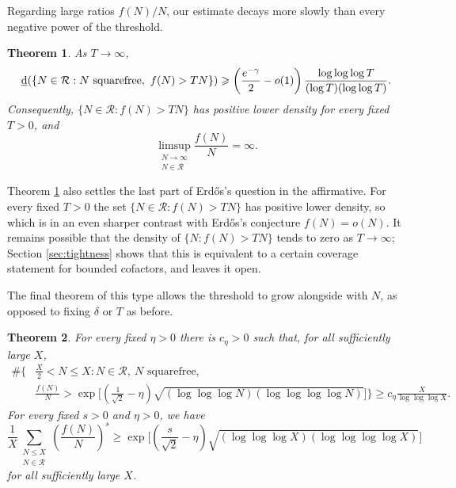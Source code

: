 \documentclass[11pt,letterpaper,reqno]{amsart}
\numberwithin{equation}{section}
\newtheorem{theorem}{Theorem}[section]
\theoremstyle{remark}
\newcommand{\N}{\mathbb{N}}
\newcommand{\Rcal}{\mathcal{R}}
\newcommand{\1}{\mathbf 1}
\newcommand{\lowerdens}{\underline{\textup{d}}}
\renewcommand{\leq}{\leqslant}
\renewcommand{\geq}{\geqslant}
\begin{document}
Regarding large ratios $f(N)/N$, our estimate decays more slowly than every
negative power of the threshold.

\begin{theorem}
\label{thm:almost-log-tail}
As $T\to\infty$,
\begin{equation}\label{eq:almost-log-tail}
 \lowerdens(\{N\in\Rcal:N\text{ squarefree},\ f(N)>TN\})
 \geq\left(\frac{e^{-\gamma}}2-o(1)\right)
 \frac{\log\log\log T}{(\log T)(\log\log T)}.
\end{equation}
Consequently, $\{N\in\Rcal:f(N)>TN\}$ has positive lower density
for every fixed $T>0$, and
\[
 \limsup_{\substack{N\to\infty\\N\in\Rcal}}\frac{f(N)}N=\infty.
\]
\end{theorem}

Theorem \ref{thm:almost-log-tail} also settles the last part of Erd\H{o}s's question in the affirmative.
For every fixed $T>0$ the set $\{N\in\Rcal:f(N)>TN\}$ has positive lower density, so which is in an even sharper contrast with Erd\H{o}s's conjecture $f(N)=o(N)$. It remains possible that the density of $\{N:f(N)>TN\}$ tends to zero as $T\to\infty$; Section \ref{sec:tightness} shows that this is equivalent to a certain coverage statement for bounded cofactors, and leaves it open.

The final theorem of this type allows the threshold to grow alongside with $N$, as opposed to fixing $\delta$ or $T$ as before.

\begin{theorem}
\label{thm:subexp-growth}
For every fixed $\eta>0$ there is $c_\eta>0$ such that, for all
sufficiently large $X$,
\begin{equation}\label{eq:subexp-growth}
\begin{aligned}
 \#\biggl\{ & \frac X2<N\leq X:N\in\Rcal,\ N\text{ squarefree},\\
 & \frac{f(N)}N>
 \exp\biggl[\left(\frac1{\sqrt2}-\eta\right)
 \sqrt{(\log\log\log N)(\log\log\log\log N)}\biggr]\biggr\}
 \geq c_\eta\frac X{\log\log\log X}.
\end{aligned}
\end{equation}
For every fixed $s>0$ and $\eta>0$, we have
\begin{equation}\label{eq:positive-moment-growth}
 \frac1X\sum_{\substack{N\leq X\\N\in\Rcal}}
 \left(\frac{f(N)}N\right)^s
 \geq\exp\biggl[\left(\frac{s}{\sqrt2}-\eta\right)
 \sqrt{(\log\log\log X)(\log\log\log\log X)}\biggr]
\end{equation}
for all sufficiently large $X$.
\end{theorem}
\end{document}
